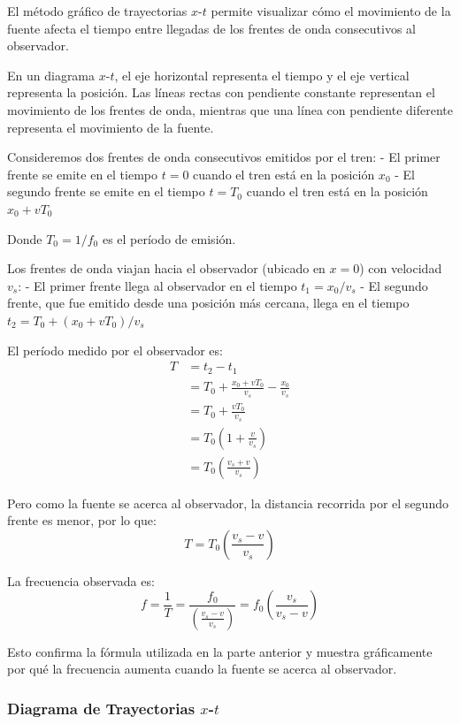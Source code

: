 \documentclass[
  11pt,
  letterpaper,
   addpoints,
   answers
  ]{exam}
\begin{document}
\begin{questions}
\begin{solution}
El método gráfico de trayectorias $x$-$t$ permite visualizar cómo el movimiento de la fuente afecta el tiempo entre llegadas de los frentes de onda consecutivos al observador.

En un diagrama $x$-$t$, el eje horizontal representa el tiempo y el eje vertical representa la posición. Las líneas rectas con pendiente constante representan el movimiento de los frentes de onda, mientras que una línea con pendiente diferente representa el movimiento de la fuente.

Consideremos dos frentes de onda consecutivos emitidos por el tren:
- El primer frente se emite en el tiempo $t = 0$ cuando el tren está en la posición $x_0$
- El segundo frente se emite en el tiempo $t = T_0$ cuando el tren está en la posición $x_0 + vT_0$

Donde $T_0 = 1/f_0$ es el período de emisión.

Los frentes de onda viajan hacia el observador (ubicado en $x = 0$) con velocidad $v_s$:
- El primer frente llega al observador en el tiempo $t_1 = x_0/v_s$
- El segundo frente, que fue emitido desde una posición más cercana, llega en el tiempo $t_2 = T_0 + (x_0 + vT_0)/v_s$

El período medido por el observador es:
\begin{align}
T &= t_2 - t_1 \\
&= T_0 + \frac{x_0 + vT_0}{v_s} - \frac{x_0}{v_s} \\
&= T_0 + \frac{vT_0}{v_s} \\
&= T_0\left(1 + \frac{v}{v_s}\right) \\
&= T_0\left(\frac{v_s + v}{v_s}\right)
\end{align}

Pero como la fuente se acerca al observador, la distancia recorrida por el segundo frente es menor, por lo que:
\begin{equation}
T = T_0\left(\frac{v_s - v}{v_s}\right)
\end{equation}

La frecuencia observada es:
\begin{equation}
f = \frac{1}{T} = \frac{f_0}{\left(\frac{v_s - v}{v_s}\right)} = f_0\left(\frac{v_s}{v_s - v}\right)
\end{equation}

Esto confirma la fórmula utilizada en la parte anterior y muestra gráficamente por qué la frecuencia aumenta cuando la fuente se acerca al observador.

\subsubsection*{Diagrama de Trayectorias $x$-$t$}


\end{solution}
\end{questions}
\end{document}
